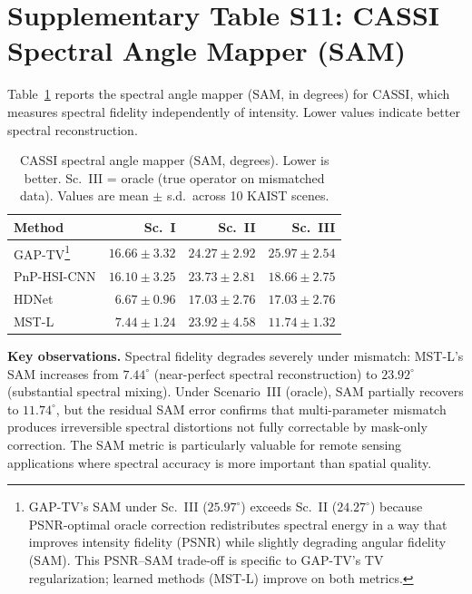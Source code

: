\documentclass[11pt]{article}
\begin{document}
\section{Supplementary Table S11: CASSI Spectral Angle Mapper (SAM)}
\label{sec:sam}

Table~\ref{tab:sam} reports the spectral angle mapper (SAM, in degrees)
for CASSI, which measures spectral fidelity independently of intensity.
Lower values indicate better spectral reconstruction.

\begin{table}[htbp]
\centering
\caption{CASSI spectral angle mapper (SAM, degrees). Lower is better.
Sc.~III = oracle (true operator on mismatched data).
Values are mean $\pm$ s.d.\ across 10 KAIST scenes.}
\label{tab:sam}
\begin{tabular}{l r r r}
\toprule
\textbf{Method} &
  \textbf{Sc.~I} & \textbf{Sc.~II} & \textbf{Sc.~III} \\
\midrule
GAP-TV\footnote{GAP-TV's SAM under Sc.~III ($25.97^\circ$) exceeds Sc.~II ($24.27^\circ$) because PSNR-optimal oracle correction redistributes spectral energy in a way that improves intensity fidelity (PSNR) while slightly degrading angular fidelity (SAM).  This PSNR--SAM trade-off is specific to GAP-TV's TV regularization; learned methods (MST-L) improve on both metrics.}      & $16.66 \pm 3.32$ & $24.27 \pm 2.92$ & $25.97 \pm 2.54$ \\
PnP-HSI-CNN & $16.10 \pm 3.25$ & $23.73 \pm 2.81$ & $18.66 \pm 2.75$ \\
HDNet       & $6.67 \pm 0.96$  & $17.03 \pm 2.76$ & $17.03 \pm 2.76$ \\
MST-L       & $7.44 \pm 1.24$  & $23.92 \pm 4.58$ & $11.74 \pm 1.32$ \\
\bottomrule
\end{tabular}
\end{table}

\noindent\textbf{Key observations.}
Spectral fidelity degrades severely under mismatch: MST-L's SAM increases
from $7.44^\circ$ (near-perfect spectral reconstruction) to $23.92^\circ$
(substantial spectral mixing). Under Scenario~III (oracle), SAM partially recovers
to $11.74^\circ$, but the residual SAM error confirms
that multi-parameter mismatch produces irreversible spectral distortions
not fully correctable by mask-only correction. The SAM metric is
particularly valuable for remote sensing applications where spectral
accuracy is more important than spatial quality.
\end{document}
